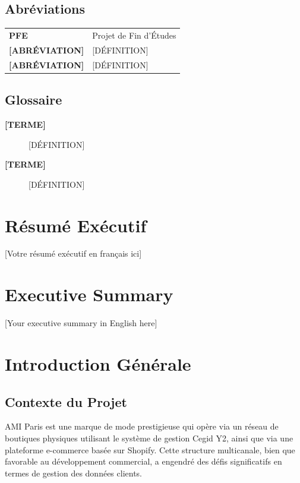 \documentclass[12pt,a4paper]{report}
\begin{document}
\section*{Abréviations}
\begin{tabular}{ll}
    \textbf{PFE} & Projet de Fin d'Études \\
    \textbf{[ABRÉVIATION]} & [DÉFINITION] \\
    \textbf{[ABRÉVIATION]} & [DÉFINITION] \\
\end{tabular}

\section*{Glossaire}
\begin{description}
    \item[\textbf{[TERME]}] [DÉFINITION]
    \item[\textbf{[TERME]}] [DÉFINITION]
\end{description}

\clearpage

\chapter*{Résumé Exécutif}

[Votre résumé exécutif en français ici]

\clearpage

\chapter*{Executive Summary}

[Your executive summary in English here]

\clearpage


\chapter{Introduction Générale}
\section{Contexte du Projet}
AMI Paris est une marque de mode prestigieuse qui opère via un réseau de boutiques physiques utilisant le système de gestion Cegid Y2, ainsi que via une plateforme e-commerce basée sur Shopify. Cette structure multicanale, bien que favorable au développement commercial, a engendré des défis significatifs en termes de gestion des données clients.
\end{document}
